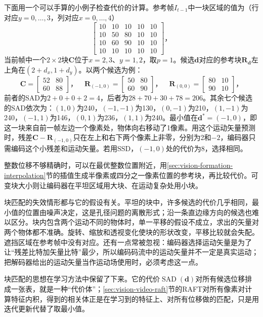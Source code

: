 下面用一个可以手算的小例子检查代价的计算。参考帧$I_{t-1}$中一块区域的值为（行对应$y=0,\ldots,3$，列对应$x=0,\ldots,4$）
\[
  \begin{bmatrix}
    10&10&10&10&10\\
    10&50&80&10&10\\
    10&60&90&10&10\\
    10&10&10&10&10
  \end{bmatrix}\text{，}
\]
当前帧中一个$2\times2$块$\bm C$位于$x=2,3$、$y=1,2$，取$p=1$。候选$\bm d$对应的参考块$\bm R_{\bm d}$左上角在$(2+d_x,1+d_y)$。以两个候选为例：
\[
  \bm C=\begin{bmatrix}52&80\\60&88\end{bmatrix}\text{，}\quad
  \bm R_{(-1,0)}=\begin{bmatrix}50&80\\60&90\end{bmatrix}\text{，}\quad
  \bm R_{(0,0)}=\begin{bmatrix}80&10\\90&10\end{bmatrix}\text{，}
\]
前者的SAD为$2+0+0+2=4$，后者为$28+70+30+78=206$。其余七个候选的SAD依次为：$(1,0)$为240，$(-1,-1)$为130，$(0,-1)$为210，$(1,-1)$为240，$(-1,1)$为146，$(0,1)$为236，$(1,1)$为240。最小值在$\bm d^*=(-1,0)$，即这一块来自前一帧左边一个像素处，物体向右移动了1像素。用这个运动矢量预测时，残差$\bm C-\bm R_{(-1,0)}$只在左上和右下两个像素上非零，分别为2和$-2$，编码器只需编码这个小残差和运动矢量。若用SSD，$(-1,0)$处的代价为8，选择相同。

整数位移不够精确时，可以在最优整数位置附近，用\ref{sec:vision-formation-interpolation}节的插值生成半像素或四分之一像素位置的参考块，再比较代价。可变块大小则让编码器在平坦区域用大块、在运动复杂处用小块。

块匹配的失效情形都与它的假设有关。平坦的块中，许多候选的代价几乎相同，最小值的位置由噪声决定，这是孔径问题的离散形式；沿一条直边缘方向的候选也难以区分。块内包含两个运动不同的物体时，单一平移的假设不成立，求出的矢量对两个物体都不准确。旋转、缩放和透视变化使块的形状改变，平移比较就会失配。遮挡区域在参考帧中没有对应。还有一点常被忽视：编码器选择运动矢量是为了让“残差比特加矢量比特”最少，所以编码码流中的运动矢量并不一定是真实运动；把解码器给出的运动矢量当作运动场使用时，必须考虑这一点。

块匹配的思想在学习方法中保留了下来。它的代价$\operatorname{SAD}(\bm d)$对所有候选位移排成一张表，就是一种“代价体”；\ref{sec:vision-video-raft}节的RAFT对所有像素对计算特征内积，得到的相关体正是在学习到的特征上、对所有位移做的匹配，只是用迭代更新代替了取最小值。

